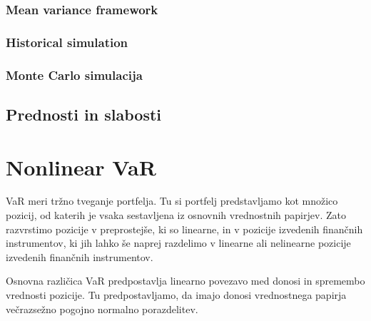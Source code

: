 \documentclass[a4paper, 12pt]{article}
\theoremstyle{definition}
\theoremstyle{plain}
\begin{document}
\subsubsection{Mean variance framework}

\subsubsection{Historical simulation}


\subsubsection{Monte Carlo simulacija}

\subsection{Prednosti in slabosti}

\section{Nonlinear VaR}
VaR meri tržno tveganje portfelja. Tu si portfelj predstavljamo kot množico 
pozicij, od katerih je vsaka sestavljena iz osnovnih vrednostnih papirjev. Zato razvrstimo pozicije
v preprostejše, ki so linearne, in v pozicije izvedenih finančnih instrumentov, ki jih lahko še naprej
razdelimo v linearne ali nelinearne pozicije izvedenih finančnih instrumentov.


Osnovna različica VaR predpostavlja linearno povezavo med donosi in spremembo vrednosti pozicije.
Tu predpostavljamo, da imajo donosi vrednostnega papirja večrazsežno pogojno normalno porazdelitev.  
\end{document}
